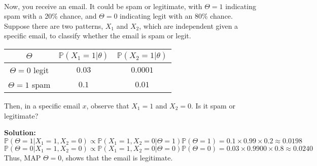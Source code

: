 \begin{eg}[Estimation]~

  Now, you receive an email. It could be spam or legitimate, with \(\Theta = 1\) indicating spam with a 20\% chance, and \(\Theta = 0\) indicating legit with an 80\% chance. Suppose there are two patterns, \(X_1\) and \(X_2\), which are independent given a specific email, to classify whether the email is spam or legit.

  \begin{table}[H]
    \centering
    \begin{tabular}{c|c|c}
        \toprule
        \(\Theta\) & \(\mathbb{P}(X_1 = 1 \vert \theta)\) & \(\mathbb{P}(X_2 = 1 \vert \theta)\)  \\
      \midrule
        \(\Theta = 0\) legit & \(0.03\) & \(0.0001\)  \\
        \(\Theta = 1\) spam & \(0.1\) & \(0.01\)  \\
        \bottomrule
    \end{tabular}
  \end{table}
  Then, in a specific email \(x\), observe that \(X_1 = 1\) and \(X_2 = 0\). Is it spam or legitimate?

  \textbf{Solution:} 
  \[
    \mathbb{P}(\Theta = 1 \vert X_1 = 1, X_2 = 0) \propto \mathbb{P}(X_1 = 1, X_2 = 0 \vert \Theta = 1)\mathbb{P}(\Theta = 1) = 0.1 \times 0.99 \times 0.2 \approx 0.0198
  \]
  \[
    \mathbb{P}(\Theta = 0 \vert X_1 = 1, X_2 = 0) \propto \mathbb{P}(X_1 = 1, X_2 = 0 \vert \Theta = 0)\mathbb{P}(\Theta = 0) = 0.03 \times 0.9900 \times 0.8 \approx 0.0240
  \]
  Thus, MAP \(\Theta = 0\), shows that the email is legitimate. 
\end{eg}

